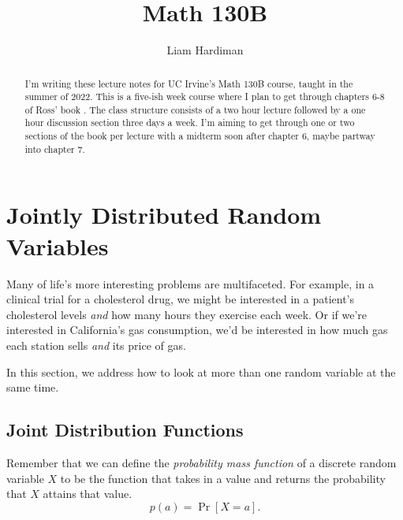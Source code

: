 \documentclass[12pt]{article}
\theoremstyle{plain}
\theoremstyle{definition}
\theoremstyle{remark}
\begin{document}
 
 
\title{Math 130B}
\author{Liam Hardiman}

\maketitle

\begin{abstract}
    I'm writing these lecture notes for UC Irvine's Math 130B course, taught in the summer of 2022.
    This is a five-ish week course where I plan to get through chapters 6-8 of Ross' book \cite{Ross}.
    The class structure consists of a two hour lecture followed by a one hour discussion section three days a week.
    I'm aiming to get through one or two sections of the book per lecture with a midterm soon after chapter 6, maybe partway into chapter 7.

\end{abstract}


\tableofcontents


\section{Jointly Distributed Random Variables}
Many of life's more interesting problems are multifaceted.
For example, in a clinical trial for a cholesterol drug, we might be interested in a patient's cholesterol levels \emph{and} how many hours they exercise each week.
Or if we're interested in California's gas consumption, we'd be interested in how much gas each station sells \emph{and} its price of gas.

In this section, we address how to look at more than one random variable at the same time.


\subsection{Joint Distribution Functions}

Remember that we can define the \emph{probability mass function} of a discrete random variable $X$ to be the function that takes in a value and returns the probability that $X$ attains that value.
\[
    p(a) = \Pr[X = a].
\]
\end{document}
